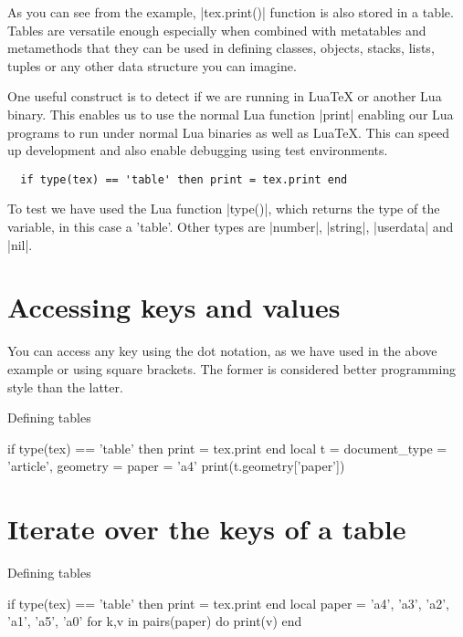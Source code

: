 As you can see from the example, |tex.print()| function is also stored in a table. Tables are versatile enough especially when combined with metatables and metamethods that they can be used in defining classes, objects,  stacks, lists, tuples or any other data structure you can imagine. 

One useful construct is to detect if we are running in LuaTeX or another Lua binary. This enables us to use the normal Lua function |print|  enabling our Lua programs to run under normal Lua binaries as well as LuaTeX. This can speed up development and also enable debugging using test environments.

\begin{scriptexample}{}{}
\begin{verbatim}
  if type(tex) == 'table' then print = tex.print end
\end{verbatim}
\end{scriptexample}

To test we have used the Lua function |type()|, which returns the type of the variable, in this case a 'table'. Other types are |number|, |string|, |userdata| and |nil|. 

\section{Accessing keys and values}

You can access any key using the dot notation, as we have used in the above example or using square brackets. The former is considered better programming style than the latter.

\begin{texexample}{Defining tables}{}
\begin{luacode}
if type(tex) == 'table' then print = tex.print end
local t = {
    document_type = {'article'},
    geometry = {
       paper = 'a4'
     }
  } 
 print(t.geometry['paper'])
\end{luacode}
\end{texexample}

\section{Iterate over the keys of a table}

\begin{texexample}{Defining tables}{}
\begin{luacode}
if type(tex) == 'table' then print = tex.print end
local paper = {'a4', 'a3', 'a2', 'a1', 'a5', 'a0' }
for k,v in pairs(paper) do
   print(v)
end
\end{luacode}
\end{texexample}


